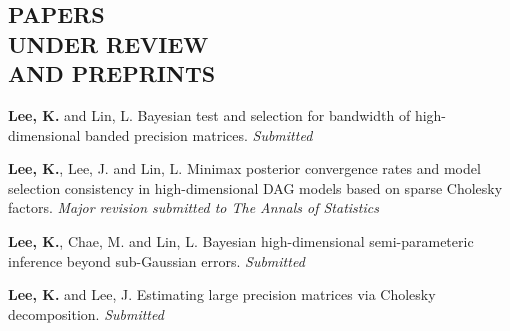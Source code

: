 \documentclass[margin, 10pt]{res} %
\begin{document}
\begin{resume}
\section{\sf PAPERS \\ UNDER REVIEW \\ AND PREPRINTS} 

\begin{enumerate}[label={[\roman*]}] 
	\item {\bf Lee, K.} and Lin, L. Bayesian test and selection for bandwidth of high-dimensional banded precision matrices. {\it Submitted}
	\item {\bf Lee, K.}, Lee, J. and Lin, L. Minimax posterior convergence rates and model selection consistency in high-dimensional DAG models based on sparse Cholesky factors. {\it Major revision submitted to The Annals of Statistics}
	\item {\bf Lee, K.}, Chae, M. and Lin, L. Bayesian high-dimensional semi-parameteric inference beyond sub-Gaussian errors. {\it Submitted}
	\item {\bf Lee, K.} and Lee, J. Estimating large precision matrices via Cholesky decomposition. {\it Submitted}
\end{enumerate}
\vspace{.2cm}




%
%
%




\end{resume}
\end{document}
